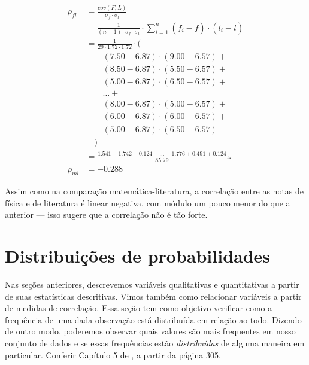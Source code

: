 \begin{sol}
\begin{align*}
    \rho_{fl} &=
        \frac{cov(F,L)}{\sigma_f \cdot \sigma_l} \\
    &= \frac{1}{(n-1) \cdot \sigma_f \cdot \sigma_l} \cdot
        \sum_{i=1}^{n} (f_i - \overline{f}) \cdot (l_i - \overline{l}) \\
    &= \frac{1}{29 \cdot 1.72 \cdot 1.72} \cdot \Big( \\
            & \quad \quad (7.50 - 6.87) \cdot (9.00 - 6.57) + \\
            & \quad \quad (8.50 - 6.87) \cdot (5.50 - 6.57) + \\
            & \quad \quad (5.00 - 6.87) \cdot (6.50 - 6.57) + \\
            & \quad \quad \ldots + \\
            & \quad \quad (8.00 - 6.87) \cdot (5.00 - 6.57) + \\
            & \quad \quad (6.00 - 6.87) \cdot (6.00 - 6.57) + \\
            & \quad \quad (5.00 - 6.87) \cdot (6.50 - 6.57) \\
            & \quad \Big) \\
    &= \frac{1.541 -1.742 + 0.124 + \ldots -1.776 + 0.491 + 0.124}{85.79} \therefore \\
    \rho_{ml} &= -0.288
\end{align*}

Assim como na comparação matemática-literatura, a correlação entre as notas de
física e de literatura é linear negativa, com módulo um pouco menor do que a
anterior --- isso sugere que a correlação não é tão forte.
\end{sol}

\section{Distribuições de probabilidades}%
\label{sec:dist-probab}

Nas seções anteriores, descrevemos variáveis qualitativas e quantitativas a
partir de suas estatísticas descritivas. Vimos também como relacionar variáveis
a partir de medidas de correlação. Essa seção tem como objetivo verificar como
a frequência de uma dada observação está distribuída em relação ao todo.
Dizendo de outro modo, poderemos observar quais valores são mais frequentes em
nosso conjunto de dados e se essas frequências estão \emph{distribuídas} de
alguma maneira em particular. Conferir Capítulo 5 de \cite{favero}, a partir da
página 305.

